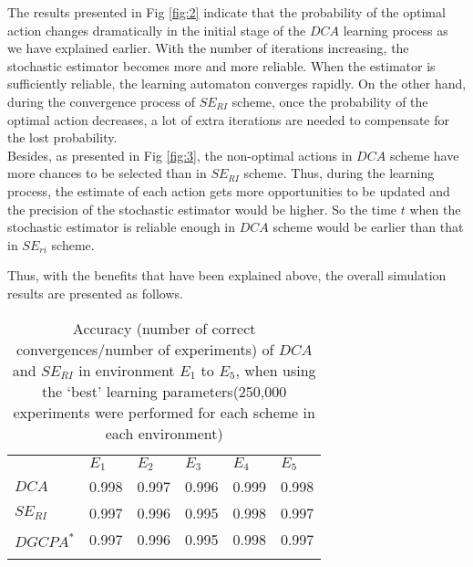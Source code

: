 The results presented in Fig \ref{fig:2} indicate that the probability of the optimal action changes dramatically in the initial stage of the $DCA$ learning process as we have explained earlier. With the number of iterations increasing, the stochastic estimator becomes more and more reliable. When the estimator is sufficiently reliable, the learning automaton converges rapidly. On the other hand, during the convergence process of $SE_{RI}$ scheme, once the probability of the optimal action decreases, a lot of extra iterations are needed to compensate for the lost probability.\\

Besides, as presented in Fig \ref{fig:3}, the non-optimal actions in $DCA$ scheme have more chances to be selected than in $SE_{RI}$ scheme. Thus, during the learning process, the estimate of each action gets more opportunities to be updated and the precision of the stochastic estimator would be higher. So the time $t$ when the stochastic estimator is reliable enough in $DCA$ scheme would be earlier than that in $SE_{ri}$ scheme.

Thus, with the benefits that have been explained above, the overall simulation results are presented as follows.


\begin{table}
\caption{Accuracy (number of correct convergences/number of experiments) of $DCA$ and $SE_{RI}$ in environment $E_1$ to $E_5$, when using the ‘best’ learning parameters(250,000 experiments were performed for each scheme in each environment)}
\label{tab:1}       %
\begin{tabular}{llllll}
\hline\noalign{\smallskip}
  & $E_1$ & $E_2$ & $E_3$ & $E_4$ & $E_5$  \\
\noalign{\smallskip}\hline\noalign{\smallskip}
$DCA$ & 0.998 & 0.997 & 0.996 & 0.999 & 0.998\\
$SE_{RI}$ & 0.997 & 0.996 & 0.995 & 0.998 & 0.997  \\
$DGCPA^{*}$ & 0.997 & 0.996 & 0.995 & 0.998 & 0.997  \\
\noalign{\smallskip}\hline
\end{tabular}
\end{table}


